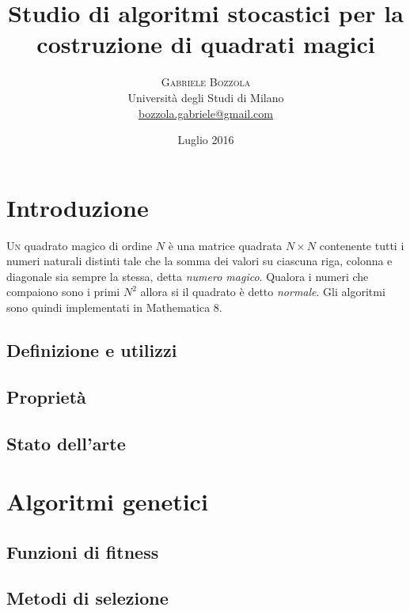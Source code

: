 \documentclass[twoside,twocolumn]{article}
\title{Studio di algoritmi stocastici per la costruzione di quadrati magici} %
\author{%
\textsc{Gabriele Bozzola} \\[1ex] %
\normalsize Università degli Studi di Milano \\ %
\normalsize \href{mailto:bozzola.gabriele@gmail.com}{bozzola.gabriele@gmail.com} %
}
\date{Luglio 2016} %
\begin{document}
\maketitle


\section{Introduzione}

\lettrine[nindent=0em,lines=3]{U}n quadrato magico di ordine $ N $ è una matrice quadrata $ N\times N $ contenente tutti i numeri naturali distinti tale che la somma dei valori su ciascuna riga, colonna e diagonale sia sempre la stessa, detta \emph{numero magico}. Qualora i numeri che compaiono sono i primi $ N^2 $ allora si il quadrato è detto \emph{normale}. Gli algoritmi sono quindi implementati in Mathematica 8.

\subsection{Definizione e utilizzi}


\subsection{Proprietà}

\blindtext %

\subsection{Stato dell'arte}

\blindtext %

\section{Algoritmi genetici}

\subsection{Funzioni di fitness}

\subsection{Metodi di selezione}
\end{document}
